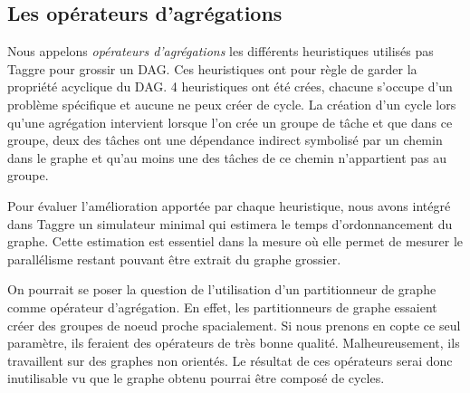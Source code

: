 \subsection{Les opérateurs d'agrégations}
Nous appelons {\em opérateurs d'agrégations} les différents heuristiques utilisés pas Taggre pour grossir un DAG.
%
Ces heuristiques ont pour règle de garder la propriété acyclique du DAG.
%
4 heuristiques ont été crées, chacune s'occupe d'un problème spécifique et aucune ne peux créer de cycle.
%
La création d'un cycle lors qu'une agrégation intervient lorsque l'on crée un groupe de tâche et que dans ce groupe, deux des tâches ont une dépendance indirect symbolisé par un chemin dans le graphe et qu'au moins une des tâches de ce chemin n'appartient pas au groupe.


Pour évaluer l'amélioration apportée par chaque heuristique, nous avons intégré dans Taggre un simulateur minimal qui estimera le temps d'ordonnancement du graphe.
%
Cette estimation est essentiel dans la mesure où elle permet de mesurer le parallélisme restant pouvant être extrait du graphe grossier.

On pourrait se poser la question de l'utilisation d'un partitionneur de graphe comme opérateur d'agrégation.
%
En effet, les partitionneurs de graphe essaient créer des groupes de noeud proche spacialement.
%
Si nous prenons en copte ce seul paramètre, ils feraient des opérateurs de très bonne qualité.
%
Malheureusement, ils travaillent sur des graphes non orientés.
%
Le résultat de ces opérateurs serai donc inutilisable vu que le graphe obtenu pourrai être composé de cycles.
